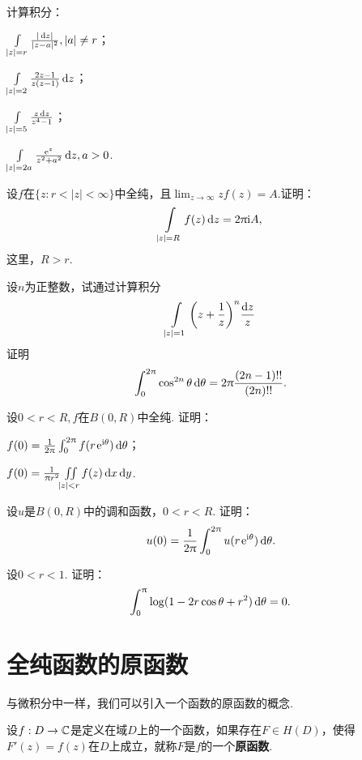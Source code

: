 \begin{xiti}
  \item 计算积分：
    \begin{enuma}
      \item $\int\limits_{|z|=r}\frac{|\mathop{}\!\mathrm dz|}{|z-a|^2},|a|\ne r$；
      \item $\int\limits_{|z|=2}\frac{2z-1}{z(z-1)}\mathop{}\!\mathrm dz$；
      \item $\int\limits_{|z|=5}\frac{z\mathop{}\!\mathrm dz}{z^4-1}$；
      \item $\int\limits_{|z|=2a}\frac{\operatorname{\!\!\;\mathrm e}^z}{z^2+a^2}\mathop{}\!\mathrm dz,a>0$.
    \end{enuma}
  \item 设$f$在$\{z:r<|z|<\infty\}$中全纯，且$\lim_{z\to\infty}zf(z)=A$.证明：
    \[
      \int\limits_{|z|=R}f(z)\mathop{}\!\mathrm dz = 2\uppi\mathrm i A,
    \]
    这里，$R>r$.
  \item 设$n$为正整数，试通过计算积分
    \[
      \int\limits_{|z|=1}\bigg(z+\frac1z\bigg)^n\frac{\mathop{}\!\mathrm dz}z
    \]
    证明
    \[
      \int_0^{2\uppi}\cos^{2n}\theta\mathop{}\!\mathrm{d} \theta = 2\uppi\frac{(2n-1)!!}{(2n)!!}.
    \]
  \item 设$0<r<R,f$在$B(0,R)$中全纯. 证明：
    \begin{enuma}
      \item $f(0)=\frac1{2\uppi}\int_0^{2\uppi}f(r\operatorname{\!\!\;\mathrm e}^{\mathrm i\theta})\mathop{}\!\mathrm{d} \theta$；
      \item $f(0)=\frac1{\uppi r^2}\iint\limits_{|z|<r}f(z)\mathop{}\!\mathrm dx\mathop{}\!\mathrm dy$.
    \end{enuma}
  \item 设$u$是$B(0,R)$中的调和函数，$0<r<R$. 证明：
    \[
      u(0) = \frac1{2\uppi}\int_0^{2\uppi}u(r\operatorname{\!\!\;\mathrm e}^{\mathrm i\theta})\mathop{}\!\mathrm{d} \theta.
    \]
  \item 设$0<r<1$. 证明：
    \[
      \int_0^\uppi\log(1-2r\cos\theta+r^2)\mathop{}\!\mathrm{d} \theta = 0.
    \]
\end{xiti}

\section{全纯函数的原函数\label{sec3.3}}
与微积分中一样，我们可以引入一个函数的原函数的概念.
\begin{definition}\label{def3.3.1}
  设$f:D\to\mathbb C$是定义在域$D$上的一个函数，如果存在$F\in H(D)$，使得$F'(z)=f(z)$在$D$上成立，就称$F$是$f$的一个\textbf{原函数}.
\end{definition}

